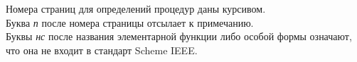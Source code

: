 \documentclass[twoside]{book}%
\begin{document}
\noindent
Номера страниц для определений процедур даны курсивом.\\
Буква {\it п} после номера страницы отсылает к примечанию.\\
Буквы {\it нс} после названия элементарной функции либо особой формы
означают, что она не входит в стандарт Scheme IEEE.\\
\begin{raggedright}
\begin{multicols}{2}
\sloppy

\end{multicols}
\end{raggedright}
\end{document}
